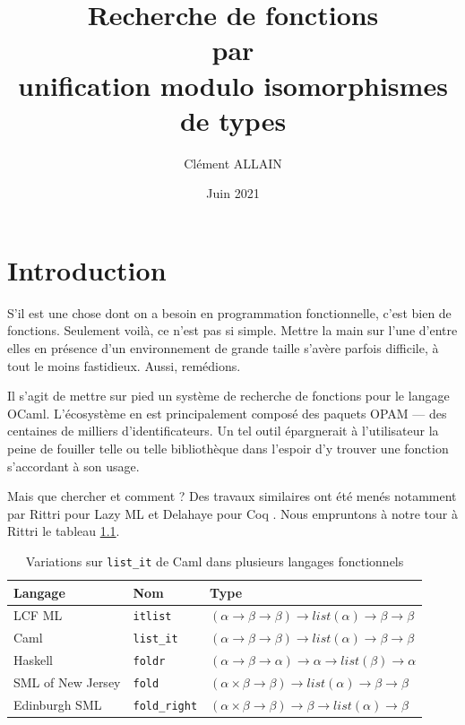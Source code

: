 \documentclass [a4paper] {report}
\title {Recherche de fonctions \\ par \\ unification modulo isomorphismes de types}
\author {Clément ALLAIN}
\date {Juin 2021}
\theoremstyle {definition}
\begin{document}
\maketitle

\tableofcontents

\newpage


\chapter {Introduction}

S'il est une chose dont on a besoin en programmation fonctionnelle, c'est bien de fonctions. Seulement voilà, ce n'est pas si simple. Mettre la main sur l'une d'entre elles en présence d'un environnement de grande taille s'avère parfois difficile, à tout le moins fastidieux. Aussi, remédions.

Il s'agit de mettre sur pied un système de recherche de fonctions pour le langage OCaml. L'écosystème en est principalement composé des paquets OPAM --- des centaines de milliers d'identificateurs. Un tel outil épargnerait à l'utilisateur la peine de fouiller telle ou telle bibliothèque dans l'espoir d'y trouver une fonction s'accordant à son usage.

Mais que chercher et comment ? Des travaux similaires ont été menés notamment par Rittri pour Lazy ML \cite {rittri91, rittri93} et Delahaye pour Coq \cite {delahaye}. Nous empruntons à notre tour à Rittri \cite {rittri91} le tableau \ref {tab_fold}.

\begin {table} [h]
	\centering
	\begin {tabular} {|l|l|l|}
		\hline
			Langage &
			Nom &
			Type
		\\
		\hline
			LCF ML &
			\texttt {itlist} &
			$(\alpha \rightarrow \beta \rightarrow \beta) \rightarrow list (\alpha) \rightarrow \beta \rightarrow \beta$
		\\
			Caml &
			\texttt {list\_it} &
			$(\alpha \rightarrow \beta \rightarrow \beta) \rightarrow list (\alpha) \rightarrow \beta \rightarrow \beta$
		\\
			Haskell &
			\texttt {foldr} &
			$(\alpha \rightarrow \beta \rightarrow \alpha) \rightarrow \alpha \rightarrow list (\beta) \rightarrow \alpha$
		\\
			SML of New Jersey &
			\texttt {fold} &
			$(\alpha \times \beta \rightarrow \beta) \rightarrow list (\alpha) \rightarrow \beta \rightarrow \beta$
		\\
			Edinburgh SML &
			\texttt {fold\_right} &
			$(\alpha \times \beta \rightarrow \beta) \rightarrow \beta \rightarrow list (\alpha) \rightarrow \beta$ \\
		\hline
	\end {tabular}
	\caption {\label {tab_fold} Variations sur \texttt {list\_it} de Caml dans plusieurs langages fonctionnels}
\end {table}
\end{document}
